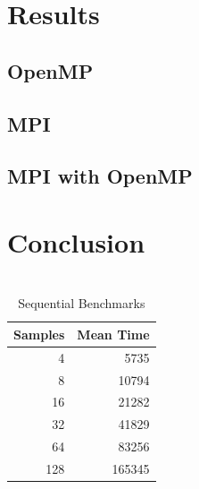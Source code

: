 \documentclass[journal,transmag]{IEEEtran}
\begin{document}
\newpage


\section{Results}
	\subsection{OpenMP}
	
	\subsection{MPI}
	
	\subsection{MPI with OpenMP}

	
\section{Conclusion}
		



\nocite{Williams:1483005}

\newpage
\onecolumn
\appendices
\section{}
	\begin{table}[h]
		\centering
		\caption{Sequential Benchmarks}
		\label{table_seq_data}
		\begin{tabular}{|r|r|}
			\hline
			\multicolumn{1}{|l|}{Samples} & \multicolumn{1}{l|}{Mean Time} \\ \hline
			4                             & 5735                           \\ \hline
			8                             & 10794                          \\ \hline
			16                            & 21282                          \\ \hline
			32                            & 41829                          \\ \hline
			64                            & 83256                          \\ \hline
			128                           & 165345                         \\ \hline
		\end{tabular}
	\end{table}
\end{document}

